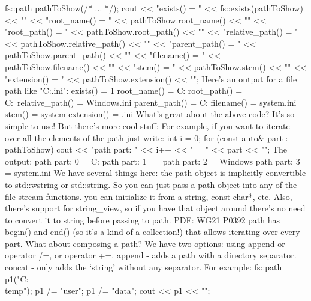 fs::path pathToShow(/* ... */);
cout << "exists() = " << fs::exists(pathToShow) << "\n"
     << "root_name() = " << pathToShow.root_name() << "\n"
     << "root_path() = " << pathToShow.root_path() << "\n"
     << "relative_path() = " << pathToShow.relative_path() << "\n"
     << "parent_path() = " << pathToShow.parent_path() << "\n"
     << "filename() = " << pathToShow.filename() << "\n"
     << "stem() = " << pathToShow.stem() << "\n"
     << "extension() = " << pathToShow.extension() << "\n";
Here’s an output for a file path like "C:\Windows\system.ini":
exists() = 1
root_name() = C:
root_path() = C:\
relative_path() = Windows\system.ini
parent_path() = C:\Windows
filename() = system.ini
stem() = system
extension() = .ini
What’s great about the above code?
It’s so simple to use! But there’s more cool stuff:
For example, if you want to iterate over all the elements of the path just write:
int i = 0;    
for (const auto& part : pathToShow)
    cout << "path part: " << i++ << " = " << part << "\n";
The output:
path part: 0 = C:
path part: 1 = \
path part: 2 = Windows
path part: 3 = system.ini
We have several things here:
the path object is implicitly convertible to std::wstring or std::string. So you can just pass a path object into any of the file stream functions.
you can initialize it from a string, const char*, etc. Also, there’s support for string_view, so if you have that object around there’s no need to convert it to string before passing to path. PDF: WG21 P0392
path has begin() and end() (so it’s a kind of a collection!) that allows iterating over every part.
What about composing a path?
We have two options: using append or operator /=, or operator +=.
append - adds a path with a directory separator.
concat - only adds the ‘string’ without any separator.
For example:
fs::path p1("C:\\temp");
p1 /= "user";
p1 /= "data";
cout << p1 << "\n";

